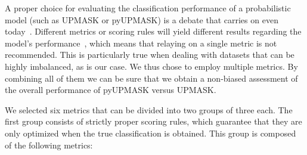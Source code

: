 \documentclass{aa}
\begin{document}
 A proper choice for evaluating the classification performance of a
 probabilistic model (such as UPMASK or pyUPMASK) is a debate that carries on
 even today~\citep{Hand_2009,hernandez_2012}. Different metrics or scoring
 rules will yield different results regarding the model's
 performance~\citep{Merkle_2013}, which means that relaying on a single metric
 is not recommended. This is particularly true when dealing with datasets that
 can be highly imbalanced, as is our case. We thus chose to employ multiple
 metrics. By combining all of them we can be sure that we obtain a non-biased
 assessment of the overall performance of pyUPMASK versus UPMASK.

 We selected six metrics that can be divided into two groups of three each.
 The first group consists of strictly proper scoring rules, which
 guarantee that they are only optimized when the true classification is
 obtained. This group is composed of the following metrics:\\

\end{document}
